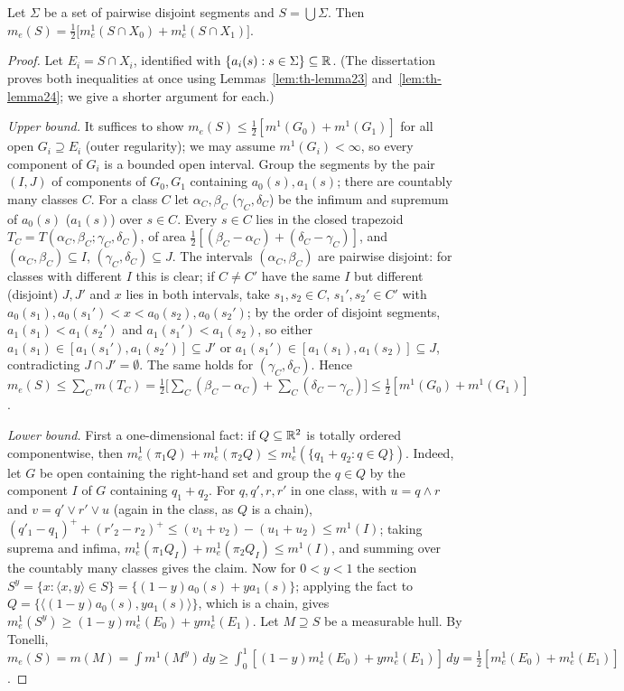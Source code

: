 \begin{theorem}\label{thm:th-thm9}
Let $\Sigma$ be a set of pairwise disjoint segments and $S=\bigcup\Sigma$. Then
$m_e(S)=\frac12\bigl[m^1_e(S\cap X_0)+m^1_e(S\cap X_1)\bigr]$.
\end{theorem}
\begin{proof}
Let $E_i=S\cap X_i$, identified with $\{a_i(s):s\in\Sigma\}\subseteq\mathbb{R}$. (The dissertation proves both inequalities at once using
Lemmas~\ref{lem:th-lemma23} and~\ref{lem:th-lemma24}; we give a shorter argument for each.)

\emph{Upper bound.} It suffices to show $m_e(S)\le\frac12[m^1(G_0)+m^1(G_1)]$ for all open $G_i\supseteq E_i$ (outer regularity);
we may assume $m^1(G_i)<\infty$, so every component of $G_i$ is a bounded open interval. Group the segments by the pair $(I,J)$ of
components of $G_0,G_1$ containing $a_0(s),a_1(s)$; there are countably many classes $C$. For a class $C$ let
$\alpha_C,\beta_C$ ($\gamma_C,\delta_C$) be the infimum and supremum of $a_0(s)$ ($a_1(s)$) over $s\in C$. Every $s\in C$ lies in the closed
trapezoid $T_C=T(\alpha_C,\beta_C;\gamma_C,\delta_C)$, of area $\frac12[(\beta_C-\alpha_C)+(\delta_C-\gamma_C)]$, and
$(\alpha_C,\beta_C)\subseteq I$, $(\gamma_C,\delta_C)\subseteq J$. The intervals $(\alpha_C,\beta_C)$ are pairwise disjoint: for classes
with different $I$ this is clear; if $C\ne C'$ have the same $I$ but different (disjoint) $J,J'$ and $x$ lies in both intervals,
take $s_1,s_2\in C$, $s_1',s_2'\in C'$ with $a_0(s_1),a_0(s_1')<x<a_0(s_2),a_0(s_2')$; by the order of disjoint segments,
$a_1(s_1)<a_1(s_2')$ and $a_1(s_1')<a_1(s_2)$, so either $a_1(s_1)\in[a_1(s_1'),a_1(s_2')]\subseteq J'$ or $a_1(s_1')\in[a_1(s_1),a_1(s_2)]\subseteq J$,
contradicting $J\cap J'=\emptyset$. The same holds for $(\gamma_C,\delta_C)$. Hence
$m_e(S)\le\sum_Cm(T_C)=\frac12\bigl[\sum_C(\beta_C-\alpha_C)+\sum_C(\delta_C-\gamma_C)\bigr]\le\frac12[m^1(G_0)+m^1(G_1)]$.

\emph{Lower bound.} First a one-dimensional fact: if $Q\subseteq\mathbb{R}^2$ is totally ordered componentwise, then
$m^1_e(\pi_1Q)+m^1_e(\pi_2Q)\le m^1_e(\{q_1+q_2:q\in Q\})$. Indeed, let $G$ be open containing the right-hand set and group
the $q\in Q$ by the component $I$ of $G$ containing $q_1+q_2$. For $q,q',r,r'$ in one class, with $u=q\wedge r$ and
$v=q'\vee r'\vee u$ (again in the class, as $Q$ is a chain), $(q'_1-q_1)^++(r'_2-r_2)^+\le(v_1+v_2)-(u_1+u_2)\le m^1(I)$; taking
suprema and infima, $m^1_e(\pi_1Q_I)+m^1_e(\pi_2Q_I)\le m^1(I)$, and summing over the countably many classes gives the claim.
Now for $0<y<1$ the section $S^y=\{x:\langle x,y\rangle\in S\}=\{(1-y)a_0(s)+ya_1(s)\}$; applying the fact to
$Q=\{\langle(1-y)a_0(s),ya_1(s)\rangle\}$, which is a chain, gives $m^1_e(S^y)\ge(1-y)m^1_e(E_0)+ym^1_e(E_1)$. Let $M\supseteq S$ be a
measurable hull. By Tonelli,
$m_e(S)=m(M)=\int m^1(M^y)\,dy\ge\int_0^1[(1-y)m^1_e(E_0)+ym^1_e(E_1)]\,dy=\frac12[m^1_e(E_0)+m^1_e(E_1)]$.
\end{proof}

